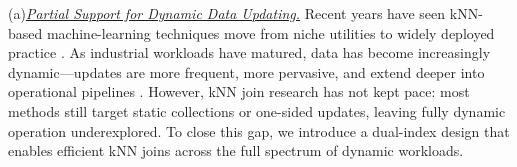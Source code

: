 \noindent (a)\underline{\emph{Partial Support for Dynamic Data Updating.}}
    Recent years have seen kNN-based machine-learning techniques move from niche utilities to widely deployed practice \cite{pan2023survey, li2023artificial, shivahare2022survey, ridwan2021applications, an2023comprehensive}. As industrial workloads have matured, data has become increasingly dynamic—updates are more frequent, more pervasive, and extend deeper into operational pipelines \cite{li2024tracking, immadisetty2025real, almeida2023time}. However, kNN join research has not kept pace: most methods still target static collections or one-sided updates, leaving fully dynamic operation underexplored. To close this gap, we introduce a dual-index design that enables efficient kNN joins across the full spectrum of dynamic workloads.


